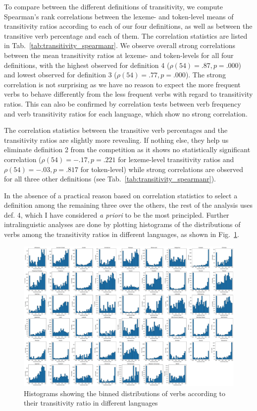 

To compare between the different definitions of transitivity, we compute Spearman's rank correlations between the lexeme- and token-level means of transitivity ratios according to each of our four definitions, as well as between the transitive verb percentage and each of them. The correlation statistics are listed in Tab.~\ref{tab:transitivity_spearmanr}. We observe overall strong correlations between the mean transitivity ratios at lexeme- and token-levels for all four definitions, with the highest observed for definition 4 ($\rho(54)=.87, p=.000$) and lowest observed for definition 3 ($\rho(54)=.77, p=.000$). The strong correlation is not surprising as we have no reason to expect the more frequent verbs to behave differently from the less frequent verbs with regard to transitivity ratios. This can also be confirmed by correlation tests between verb frequency and verb transitivity ratios for each language, which show no strong correlation.

The correlation statistics between the transitive verb percentages and the transitivity ratios are slightly more revealing. If nothing else, they help us eliminate definition 2 from the competition as it shows no statistically significant correlation ($\rho(54)=-.17, p=.221$ for lexeme-level transitivity ratios and $\rho(54)=-.03, p=.817$ for token-level) while strong correlations are observed for all three other definitions (see Tab.~\ref{tab:transitivity_spearmanr}).

In the absence of a practical reason based on correlation statistics to select a definition among the remaining three over the others, the rest of the analysis uses def. 4, which I have considered \textit{a priori} to be the most principled. Further intralinguistic analyses are done by plotting histograms of the distributions of verbs among the transitivity ratios in different languages, as shown in Fig.~\ref{fig:verb_dist_transitivity}.

\begin{figure}
  \centering
  \includegraphics[width=\textwidth]{figures/verb_dist_by_transitivity.pdf}
  \caption{Histograms showing the binned distributions of verbs according to their transitivity ratio in different languages}
  \label{fig:verb_dist_transitivity}
\end{figure}

